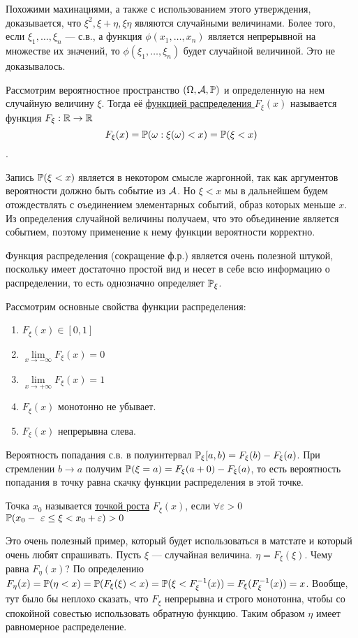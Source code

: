\documentclass[../TV&MS.tex]{subfiles}
\begin{document}
Похожими махинациями, а также с использованием этого утверждения, доказывается, что $\xi^2, \xi + \eta, \xi\eta$ являются случайными величинами.
Более того, если $\xi_1, \ldots, \xi_n$ --- с.в., а функция $\phi(x_1, \ldots, x_n)$ является непрерывной на множестве их значений, то $\phi(\xi_1, \ldots, \xi_n)$ будет случайной 
величиной. Это не доказывалось.

\begin{Def}
Рассмотрим вероятностное пространство $(\Omega, \mathcal{A}, \mathbb{P})$ и определенную на нем случайную величину $\xi$. Тогда её \underline{функцией распределения $F_\xi(x)$}
 называется функция $F_\xi : \mathbb{R} \to \mathbb{R}$
$$F_\xi(x) = \mathbb{P}(\omega : \xi(\omega) < x) = \mathbb{P}(\xi < x)$$.
\end{Def}

Запись $\mathbb{P}(\xi < x)$ является в некотором смысле жаргонной, так как аргументов вероятности должно быть событие из $\mathcal{A}$. Но $\xi < x$ мы в дальнейшем будем 
отождествлять с оъединением элементарных событий, образ которых меньше $x$. Из определения случайной величины получаем, что это объединение является событием,
поэтому применение к нему функции вероятности корректно.

Функция распределения (сокращение ф.р.) является очень полезной штукой, поскольку имеет достаточно простой вид и несет в себе всю информацию о распределении, то есть однозначно 
определяет $\mathbb{P}_\xi$.

Рассмотрим основные свойства функции распределения:
\begin{enumerate}
	\item $F_\xi(x) \in [0, 1]$
	\item $\lim\limits_{x \to -\infty} F_\xi(x) = 0$
	\item $\lim\limits_{x \to +\infty} F_\xi(x) = 1$
	\item $F_\xi(x)$ монотонно не убывает.
	\item $F_\xi(x)$ непрерывна слева.
\end{enumerate}

Вероятность попадания с.в. в полуинтервал $\mathbb{P}_\xi[a,b) = F_\xi(b) - F_\xi(a)$. При стремлении $b \to a$ получим $\mathbb{P}(\xi = a) = F_\xi(a+0) - F_\xi(a)$, то есть 
вероятность попадания в точку равна скачку функции распределения в этой точке.

\begin{Def}
Точка $x_0$ называется \underline{точкой роста} $F_\xi(x)$, если $\forall \varepsilon > 0 \quad$
$\mathbb{P}(x_0 -~\varepsilon \le \xi < x_0 + \varepsilon) > 0$
\end{Def}
\begin{Ex}
Это очень полезный пример, который будет использоваться в матстате и который очень любят спрашивать. Пусть $\xi$ --- случайная величина. $\eta = F_\xi(\xi)$. Чему равна
$F_\eta(x)$? По определению $F_\eta(x) = \mathbb{P}(\eta < x) = \mathbb{P}(F_\xi(\xi) < x)=\mathbb{P}(\xi < F_\xi^{-1}(x)) = F_\xi(F_\xi^{-1}(x))=x$. Вообще, тут было бы неплохо 
сказать, что $F_\xi$ непрерывна и строго монотонна, чтобы со спокойной совестью использовать обратную функцию. Таким образом $\eta$ имеет равномерное распределение.
\end{Ex}

\newpage
\end{document}
